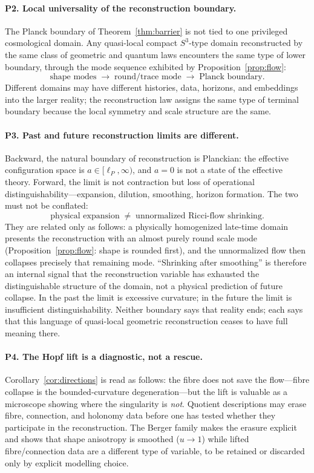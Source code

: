 \documentclass[aps,prd,twocolumn,superscriptaddress,nofootinbib,floatfix]{revtex4-2}
\theoremstyle{plain}
\theoremstyle{definition}
\newcommand{\lP}{\ell_P}
\begin{document}
\paragraph*{P2. Local universality of the reconstruction boundary.}
The Planck boundary of Theorem~\ref{thm:barrier} is not tied to one privileged cosmological domain. Any quasi-local compact $S^3$-type domain reconstructed by the same class of geometric and quantum laws encounters the same type of lower boundary, through the mode sequence exhibited by Proposition~\ref{prop:flow}:
\[
\text{shape modes}\;\longrightarrow\;\text{round/trace mode}\;\longrightarrow\;\text{Planck boundary}.
\]
Different domains may have different histories, data, horizons, and embeddings into the larger reality; the reconstruction law assigns the same type of terminal boundary because the local symmetry and scale structure are the same.

\paragraph*{P3. Past and future reconstruction limits are different.}
Backward, the natural boundary of reconstruction is Planckian: the effective configuration space is $a\in[\lP,\infty)$, and $a=0$ is not a state of the effective theory. Forward, the limit is not contraction but loss of operational distinguishability---expansion, dilution, smoothing, horizon formation. The two must not be conflated:
\[
\text{physical expansion}\;\neq\;\text{unnormalized Ricci-flow shrinking}.
\]
They are related only as follows: a physically homogenized late-time domain presents the reconstruction with an almost purely round scale mode (Proposition~\ref{prop:flow}: shape is rounded first), and the unnormalized flow then collapses precisely that remaining mode. ``Shrinking after smoothing'' is therefore an internal signal that the reconstruction variable has exhausted the distinguishable structure of the domain, not a physical prediction of future collapse. In the past the limit is excessive curvature; in the future the limit is insufficient distinguishability. Neither boundary says that reality ends; each says that this language of quasi-local geometric reconstruction ceases to have full meaning there.

\paragraph*{P4. The Hopf lift is a diagnostic, not a rescue.}
Corollary~\ref{cor:directions} is read as follows: the fibre does not save the flow---fibre collapse is the bounded-curvature degeneration---but the lift is valuable as a microscope showing where the singularity is \emph{not}. Quotient descriptions may erase fibre, connection, and holonomy data before one has tested whether they participate in the reconstruction. The Berger family makes the erasure explicit and shows that shape anisotropy is smoothed ($u\to1$) while lifted fibre/connection data are a different type of variable, to be retained or discarded only by explicit modelling choice.
\end{document}

